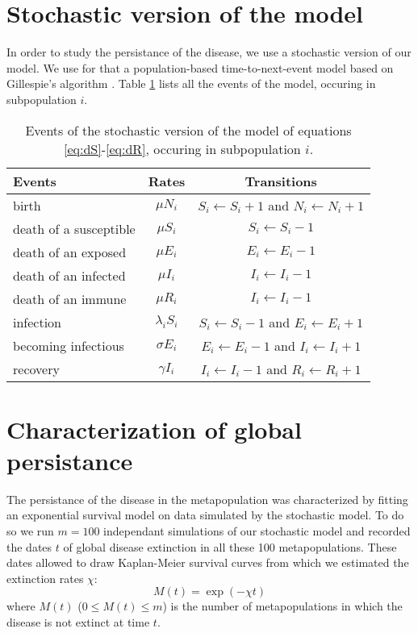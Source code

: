 \documentclass[a4paper,10pt]{article}
\begin{document}
\section{Stochastic version of the model}

In order to study the persistance of the disease, we use a stochastic version of our model. We use for that a population-based time-to-next-event model based on Gillespie's algorithm \cite{Gillespie1977}. Table \ref{tab:stoch_ev} lists all the events of the model, occuring in subpopulation $i$.
\begin{table}[htpb]
  \begin{center}
    \caption{\label{tab:stoch_ev}Events of the stochastic version of the model of equations \ref{eq:dS}-\ref{eq:dR}, occuring in subpopulation $i$.}
    \begin{tabular}{lcc}
      \toprule
      Events & Rates & Transitions \\
      \midrule
      birth & $\mu N_i$ & $S_i\leftarrow S_i+1$ and $N_i\leftarrow N_i+1$ \\
      death of a susceptible & $\mu S_i$ & $S_i\leftarrow S_i-1$ \\
      death of an exposed & $\mu E_i$ & $E_i\leftarrow E_i-1$ \\
      death of an infected  & $\mu I_i$ & $I_i\leftarrow I_i-1$ \\
      death of an immune & $\mu R_i$ & $I_i\leftarrow I_i-1$ \\
      infection & $\lambda_i S_i$ & $S_i\leftarrow S_i-1$ and $E_i\leftarrow E_i+1$ \\
      becoming infectious  & $\sigma E_i$ & $E_i\leftarrow E_i-1$ and $I_i\leftarrow I_i+1$ \\
      recovery & $\gamma I_i$ & $I_i\leftarrow I_i-1$ and $R_i\leftarrow R_i+1$ \\
      \bottomrule
    \end{tabular}
  \end{center}
\end{table}

\section{Characterization of global persistance}

The persistance of the disease in the metapopulation was characterized by fitting an exponential survival model \cite{Kleinbaum2005} on data simulated by the stochastic model. To do so we run $m=100$ independant simulations of our stochastic model and recorded the dates $t$ of global disease extinction in all these 100 metapopulations. These dates allowed to draw Kaplan-Meier survival curves from which we estimated the extinction rates $\chi$:
\begin{equation}
  M(t) = \exp(-\chi t)
\end{equation}
where $M(t)$ ($0\leqslant M(t)\leqslant m$) is the number of metapopulations in which the disease is not extinct at time $t$.
\end{document}
